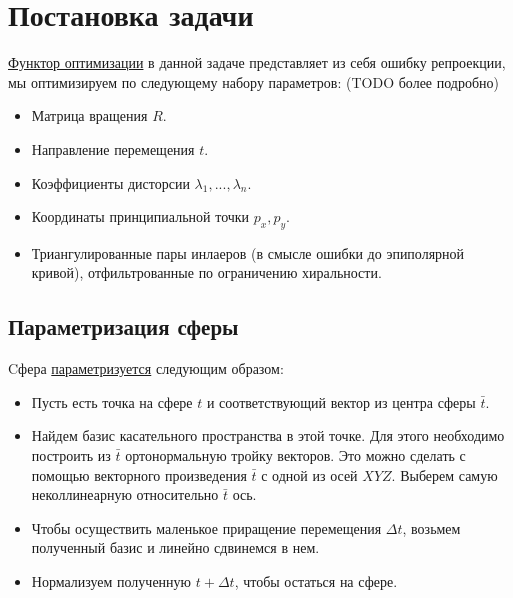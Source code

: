 \label{bundle_adj}
\section{Постановка задачи}
\href{https://github.com/QuantumMechanicus/camera_calibration_test/blob/dev/subroutines/global_non_linear_optimizer/Global_Non_Linear_Estimator.h#L30}{Функтор оптимизации} в данной задаче представляет из себя ошибку репроекции, мы оптимизируем по следующему набору параметров: (TODO более подробно)
\begin{itemize}
	\item Матрица вращения $R$.
	\item Направление перемещения $t$.
	\item Коэффициенты дисторсии $\lambda_1,...,\lambda_n$.
	\item Координаты принципиальной точки $p_x, p_y$.
	\item Триангулированные пары инлаеров (в смысле ошибки до эпиполярной кривой), отфильтрованные по ограничению хиральности.
\end{itemize}	 
\subsection{Параметризация сферы}
Cфера \href{https://github.com/QuantumMechanicus/camera_calibration_test/blob/dev/core/utils/Local_Parametrization_Sphere.h}{параметризуется} следующим образом:
\begin{itemize}
	\item Пусть есть точка на сфере $t$ и соответствующий вектор из центра сферы $\bar{t}$.
	\item Найдем базис касательного пространства в этой точке. Для этого необходимо построить из $\bar{t}$ ортонормальную тройку векторов. Это можно сделать с помощью векторного произведения $\bar{t}$ с одной из осей $XYZ$. Выберем самую неколлинеарную относительно $\bar{t}$ ось. 
	\item Чтобы осуществить маленькое приращение перемещения $\Delta t$, возьмем полученный базис и линейно сдвинемся в нем.
	\item Нормализуем полученную $t + \Delta t$, чтобы остаться на сфере.    
\end{itemize} 
\pagebreak
